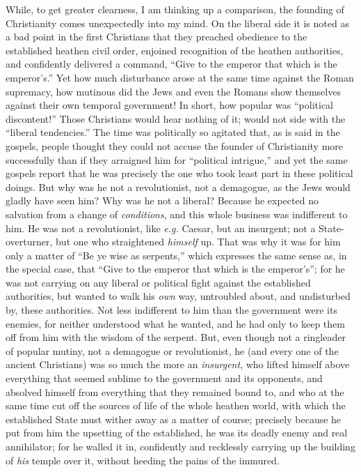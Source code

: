 \documentclass[12pt,a4paper]{book}
\begin{document}
While, to get greater clearness, I am thinking up a comparison, the founding 
of Christianity comes unexpectedly into my mind. On the liberal side it is 
noted as a bad point in the first Christians that they preached obedience to 
the established heathen civil order, enjoined recognition of the heathen 
authorities, and confidently delivered a command, ``Give to the emperor that 
which is the emperor's.'' Yet how much disturbance arose at the same time 
against the Roman supremacy, how mutinous did the Jews and even the Romans 
show themselves against their own temporal government! In short, how popular 
was ``political discontent!'' Those Christians would hear nothing of it; 
would not side with the ``liberal tendencies.'' The time was politically so 
agitated that, as is said in the gospels, people thought they could not accuse 
the founder of Christianity more successfully than if they arraigned him for 
``political intrigue,'' and yet the same gospels report that he was 
precisely the one who took least part in these political doings. But why was 
he not a revolutionist, not a demagogue, as the Jews would gladly have seen 
him? Why was he not a liberal? Because he expected no salvation from a change 
of \textit{conditions}, and this whole business was indifferent to him. He was 
not a revolutionist, like \textit{e.g.} Caesar, but an insurgent; not a 
State-overturner, but one who straightened \textit{himself} up. That was why 
it was for him only a matter of ``Be ye wise as serpents,'' which expresses 
the same sense as, in the special case, that ``Give to the emperor that which 
is the emperor's''; for he was not carrying on any liberal or political fight 
against the established authorities, but wanted to walk his \textit{own} way, 
untroubled about, and undisturbed by, these authorities. Not less indifferent 
to him than the government were its enemies, for neither understood what he 
wanted, and he had only to keep them off from him with the wisdom of the 
serpent. But, even though not a ringleader of popular mutiny, not a demagogue 
or revolutionist, he (and every one of the ancient Christians) was so much the 
more an \textit{insurgent}, who lifted himself above everything that seemed 
sublime to the government and its opponents, and absolved himself from 
everything that they remained bound to, and who at the same time cut off the 
sources of life of the whole heathen world, with which the established State 
must wither away as a matter of course; precisely because he put from him the 
upsetting of the established, he was its deadly enemy and real annihilator; 
for he walled it in, confidently and recklessly carrying up the building of 
\textit{his} temple over it, without heeding the pains of the immured.
\end{document}
